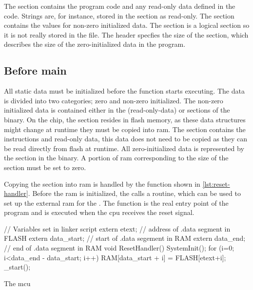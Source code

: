 The  section contains the program code and any read-only data defined in the code.
Strings are, for instance, stored in the  section as read-only.
The  section contains the values for non-zero initialized data.
The  section is a logical section so it is not really stored in the file.
The header specfies the size of the  section, which describes the size of the zero-initialized data in the program.

\subsection{Before main}
\label{sec:before-main}
All static data must be initialized before the  function starts executing.
The data is divided into two categories; zero and non-zero initialized.
The non-zero initialized data is contained either in the  (read-only-data) or  sections of the {\elf} binary.
On the chip, the  section resides in flash memory, as these data structures might change at runtime they must be copied into \gls{ram}.
The  section contains the instructions and read-only data, this data does not need to be copied as they can be read directly from flash at runtime.
All zero-initialized data is represented by the  section in the {\elf} binary.
A portion of \gls{ram} corresponding to the size of the  section must be set to zero.

Copying the  section into \gls{ram} is handled by the  function shown in \autoref{lst:reset-handler}.
Before the \gls{ram} is initialized, the  calls a  routine, which can be used to set up the external \gls{ram} for the {\gecko}.
The function is the real entry point of the program and is executed when the \gls{cpu} receives the reset signal.

\begin{listing}[H]
\begin{ccode}
// Variables set in linker script
extern etext;      // address of .data segment in FLASH
extern data_start; // start of .data segement in RAM
extern data_end;   // end of .data segment in RAM
void ResetHandler() {
  SystemInit();
  for (i=0; i<data_end - data_start; i++){
    RAM[data_start + i] = FLASH[etext+i];
  }
  _start();
}
\end{ccode}
\caption{The \gls{mcu} }
\label{lst:reset-handler}
\end{listing}


